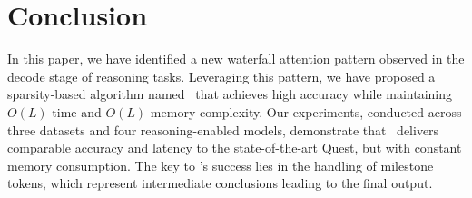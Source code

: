 \section{Conclusion}
\label{sec-conclusion}

In this paper, we have identified a new waterfall attention pattern observed in the decode stage of reasoning tasks. Leveraging this pattern, we have proposed a sparsity-based algorithm named \algo\ that achieves high accuracy while maintaining $O(L)$ time and $O(L)$ memory complexity. Our experiments, conducted across three datasets and four reasoning-enabled models, demonstrate that \algo\ delivers comparable accuracy and latency to the state-of-the-art Quest, but with constant memory consumption. The key to \algo's success lies in the handling of milestone tokens, which represent intermediate conclusions leading to the final output.